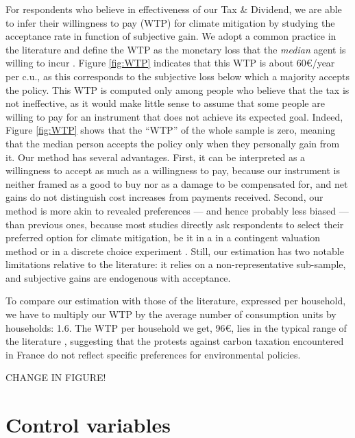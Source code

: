\documentclass[12pt]{article} %
\begin{document}
\begin{appendices}
For respondents who believe in effectiveness of our Tax \& Dividend, we are able to infer their willingness to pay (WTP) for climate mitigation by studying the acceptance rate in function of subjective gain. We adopt a common practice in the literature and define the WTP as the monetary loss that the \textit{median} agent is willing to incur \citep{hanemann_welfare_1984}. Figure \ref{fig:WTP} indicates that this WTP is about 60\euro{}/year per c.u., as this corresponds to the subjective loss below which a majority accepts the policy. This WTP is computed only among people who believe that the tax is not ineffective, as it would make little sense to assume that some people are willing to pay for an instrument that does not achieve its expected goal. Indeed, Figure \ref{fig:WTP} shows that the ``WTP'' of the whole sample is zero, meaning that the median person accepts the policy only when they personally gain from it. Our method has several advantages. First, it can be interpreted as a willingness to accept as much as a willingness to pay, because our instrument is neither framed as a good to buy nor as a damage to be compensated for, and net gains do not distinguish cost increases from payments received. Second, our method is more akin to revealed preferences --- and hence probably less biased \citep{murphy_meta-analysis_2005} --- than previous ones, because most studies directly ask respondents to select their preferred option for climate mitigation, be it in a in a contingent valuation method \citep{berrens_information_2004,cameron_individual_2005,kotchen_willingness--pay_2013} or in a discrete choice experiment \citep{longo_internalization_2008,alberini_preferences_2018}. Still, our estimation has two notable limitations relative to the literature: it relies on a non-representative sub-sample, and subjective gains are endogenous with acceptance. 

To compare our estimation with those of the literature, expressed per household, we have to multiply our WTP by the average number of consumption units by households: 1.6. The WTP per household we get, 96\euro{}, lies in the typical range of the literature \citep{jenkins_political_2014,streimikiene_review_2019}, suggesting that the protests against carbon taxation encountered in France do not reflect specific preferences for environmental policies.

CHANGE IN FIGURE!



\section{Control variables}\label{set_controls}


\end{appendices}
\end{document}
